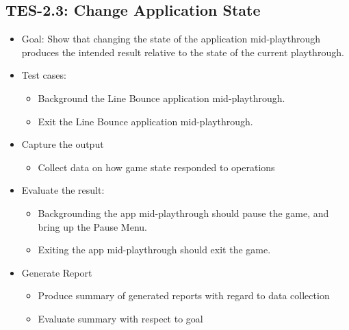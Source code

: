 \subsection{TES-2.3: Change Application State }
\begin{itemize}
\item Goal: Show that changing the state of the application mid-playthrough
produces the intended result relative to the state of the current
playthrough. 
\item Test cases: 

\begin{itemize}
\item Background the Line Bounce application mid-playthrough. 
\item Exit the Line Bounce application mid-playthrough. 
\end{itemize}
\item Capture the output 

\begin{itemize}
\item Collect data on how game state responded to operations 
\end{itemize}
\item Evaluate the result: 

\begin{itemize}
\item Backgrounding the app mid-playthrough should pause the game, and bring
up the Pause Menu. 
\item Exiting the app mid-playthrough should exit the game. 
\end{itemize}
\item Generate Report 

\begin{itemize}
\item Produce summary of generated reports with regard to data collection 
\item Evaluate summary with respect to goal
\end{itemize}
\end{itemize}

